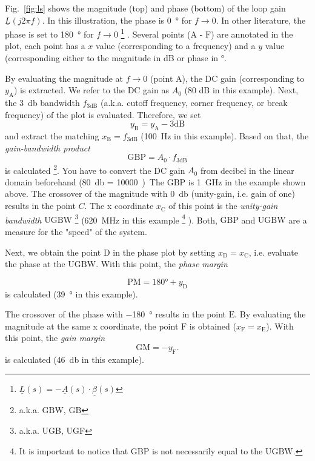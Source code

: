 \documentclass{article}[11pt]
\begin{document}
Fig.~\ref{fig:ls} shows the magnitude (top) and phase (bottom) of the 
loop gain $\underline{L}(j 2 \pi f)$.
In this illustration, the phase is \SI{0}{\degree} for $f \rightarrow 0$.
In other literature, the phase is set to \SI{180}{\degree} for 
$f \rightarrow 0$%
\footnote{$\underline{L}(s) = -\underline{A}(s) \cdot \underline{\beta}(s)$}
.
Several points ($\mathrm{A}$ - $\mathrm{F}$) are annotated in the plot, each 
point has a $x$ value (corresponding to a frequency) and a $y$ value 
(corresponding either to the magnitude in dB or phase in \si{\degree}.

\medskip

By evaluating the magnitude at $f \rightarrow 0$ (point $\mathrm{A}$), the
DC gain (corresponding to $y_{\mathrm{A}}$) is extracted.
We refer to the DC gain as $A_0$ (80 dB in this example).
Next, the \SI{3}{\decibel} bandwidth $f_{\mathrm{3dB}}$ 
(a.k.a. cutoff frequency, corner frequency, or break frequency) of the
plot is evaluated. 
Therefore, we set
$$
y_{\mathrm{B}} = y_{\mathrm{A}} - 3 \mathrm{dB}
$$
and extract the matching $x_{\mathrm{B}} = f_{\mathrm{3dB}}$ 
(\SI{100}{\hertz} in this example).
Based on that, the \textit{gain-bandwidth product}
\begin{equation}
\mathrm{GBP} = A_0 \cdot f_{\mathrm{3dB}}
\end{equation}
is calculated%
\footnote{a.k.a. $\mathrm{GBW}$, $\mathrm{GB}$}. 
You have to convert the DC gain $A_0$ from decibel in the linear domain 
beforehand (\SI{80}{\decibel} = \qty{10000}).
The $\mathrm{GBP}$ is \SI{1}{\giga\hertz} in the example shown above.
The crossover of the magnitude with \SI{0}{\decibel} 
(unity-gain, i.e. gain of one) results in the point $C$.
The x coordinate $x_{\mathrm{C}}$ of this point is the 
\textit{unity-gain bandwidth}
$\mathrm{UGBW}$%
\footnote{a.k.a. UGB, UGF}
(\SI{620}{\mega\hertz} in this example%
\footnote{It is important to notice that $\mathrm{GBP}$ is not necessarily
equal to the $\mathrm{UGBW}$.}
).
Both, $\mathrm{GBP}$ and $\mathrm{UGBW}$ are a measure for the "speed" of
the system.

\medskip

Next, we obtain the point $\mathrm{D}$ in the phase plot by setting 
$x_{\mathrm{D}} = x_{\mathrm{C}}$, i.e. evaluate the phase at the 
$\mathrm{UGBW}$.
With this point, the \textit{phase margin}

$$
\mathrm{PM} = 180° + y_{\mathrm{D}}
$$
is calculated (\SI{39}{\degree} in this example).

The crossover of the phase with \SI{-180}{\degree} results in the 
point $\mathrm{E}$.
By evaluating the magnitude at the same x coordinate, the point 
$\mathrm{F}$ is obtained ($x_{\mathrm{F}} = x_{\mathrm{E}}$).
With this point, the \textit{gain margin}
$$
\mathrm{GM} = - y_{\mathrm{F}}.
$$
is calculated (\SI{46}{\decibel} in this example).

\printbibliography
\end{document}
